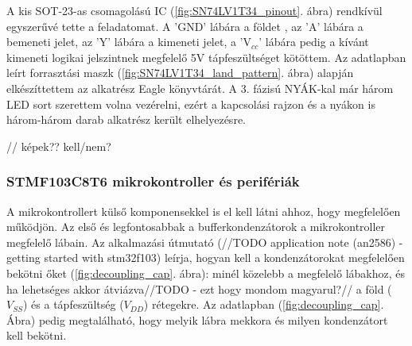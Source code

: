 \documentclass[../main.tex]{subfiles}
\begin{document}
            
            A kis SOT-23-as csomagolású IC (\ref{fig:SN74LV1T34_pinout}. ábra) rendkívül egyszerűvé tette a feladatomat. A 'GND' lábára a földet , az 'A' lábára a bemeneti jelet, az 'Y' lábára a kimeneti jelet, a 'V$_{cc}$' lábára pedig a kívánt kimeneti logikai jelszintnek megfelelő 5V tápfeszültséget %
            kötöttem. Az adatlapban leírt forrasztási maszk (\ref{fig:SN74LV1T34_land_pattern}. ábra) alapján elkészíttettem az alkatrész Eagle könyvtárát. A 3. fázisú NYÁK-kal már három LED sort szerettem volna vezérelni, ezért a kapcsolási rajzon és a nyákon is három-három darab alkatrész került elhelyezésre.
            
            // képek?? kell/nem? %
        
        \subsubsection{STMF103C8T6 mikrokontroller és perifériák}
            A mikrokontrollert külső komponensekkel is el kell látni ahhoz, hogy megfelelően működjön. Az első és legfontosabbak a bufferkondenzátorok a mikrokontroller megfelelő lábain. Az alkalmazási útmutató (//TODO application note (an2586) - getting started with stm32f103) leírja, hogyan kell a kondenzátorokat megfelelően bekötni őket (\ref{fig:decoupling_cap}. ábra): minél közelebb a megfelelő lábakhoz, és ha lehetséges akkor átviázva//TODO - ezt hogy mondom magyarul?// a föld ($V_{SS}$) és a tápfeszültség ($V_{DD}$) rétegekre. Az adatlapban (\ref{fig:decoupling_cap}. Ábra) pedig megtalálható, hogy melyik lábra mekkora és milyen kondenzátort kell bekötni.
            
\end{document}
